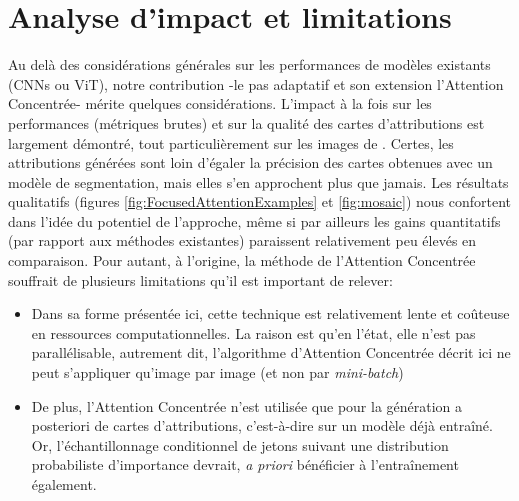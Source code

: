 \section{Analyse d'impact et limitations}
Au delà des considérations générales sur les performances de modèles existants (CNNs ou ViT), notre contribution -le pas adaptatif et son extension l'Attention Concentrée- mérite quelques considérations. L'impact à la fois sur les performances (métriques brutes) et sur la qualité des cartes d'attributions est largement démontré, tout particulièrement sur les images de \fundus{}. Certes, les attributions générées sont loin d'égaler la précision des cartes obtenues avec un modèle de segmentation, mais elles s'en approchent plus que jamais. Les résultats qualitatifs (figures \ref{fig:FocusedAttentionExamples} et \ref{fig:mosaic}) nous confortent dans l'idée du potentiel de l'approche, même si par ailleurs les gains quantitatifs (par rapport aux méthodes existantes) paraissent relativement peu élevés en comparaison. Pour autant, à l'origine, la méthode de l'Attention Concentrée souffrait de plusieurs limitations qu'il est important de relever:
\begin{itemize}
	\item Dans sa forme présentée ici, cette technique est relativement lente et coûteuse en ressources computationnelles. La raison est qu'en l'état, elle n'est pas parallélisable, autrement dit, l'algorithme d'Attention Concentrée décrit ici ne peut s'appliquer qu'image par image (et non par \textit{mini-batch})
	\item De plus, l'Attention Concentrée n'est utilisée que pour la génération a posteriori de cartes d'attributions, c'est-à-dire sur un modèle déjà entraîné. Or, l'échantillonnage conditionnel de jetons suivant une distribution probabiliste d'importance devrait, \textit{a priori} bénéficier à l'entraînement également. 
\end{itemize}

